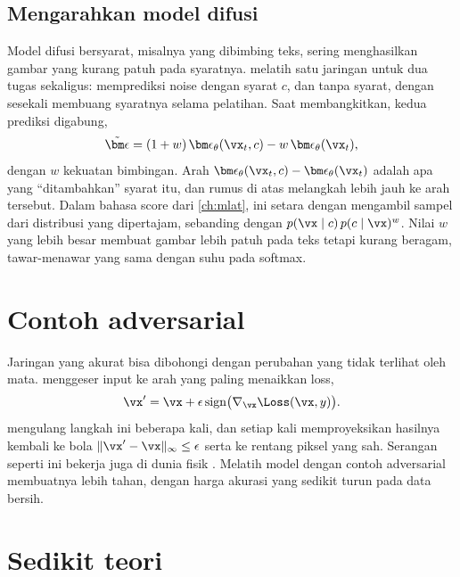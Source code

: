 \subsection{Mengarahkan model difusi}

Model difusi bersyarat, misalnya yang dibimbing teks, sering menghasilkan gambar yang kurang patuh pada syaratnya.
 \citep{ho2022cfg} melatih satu jaringan untuk dua tugas sekaligus: memprediksi noise dengan
syarat $c$, dan tanpa syarat, dengan sesekali membuang syaratnya selama pelatihan. Saat membangkitkan, kedua prediksi
digabung,
\begin{equation}
\tilde{\bm\epsilon}=(1+w)\,\bm\epsilon_\theta(\vx_t,c)-w\,\bm\epsilon_\theta(\vx_t),
\end{equation}
dengan $w$ kekuatan bimbingan. Arah $\bm\epsilon_\theta(\vx_t,c)-\bm\epsilon_\theta(\vx_t)$ adalah apa yang ``ditambahkan''
syarat itu, dan rumus di atas melangkah lebih jauh ke arah tersebut. Dalam bahasa score dari \cref{ch:mlat}, ini setara
dengan mengambil sampel dari distribusi yang dipertajam, sebanding dengan $p(\vx\mid c)\,p(c\mid\vx)^{w}$. Nilai $w$ yang lebih
besar membuat gambar lebih patuh pada teks tetapi kurang beragam, tawar-menawar yang sama dengan suhu pada softmax.

\section{Contoh adversarial}

Jaringan yang akurat bisa dibohongi dengan perubahan yang tidak terlihat oleh mata.
 menggeser input ke arah yang paling menaikkan loss,
\begin{equation}
\vx'=\vx+\epsilon\,\mathrm{sign}\big(\nabla_{\vx}\Loss(\vx,y)\big).
\end{equation}
 mengulang langkah ini beberapa kali, dan setiap kali
memproyeksikan hasilnya kembali ke bola $\|\vx'-\vx\|_\infty\le\epsilon$ serta ke rentang piksel
yang sah. Serangan seperti ini bekerja juga di dunia fisik \citep{eykholt2018}. Melatih model dengan
contoh adversarial membuatnya lebih tahan, dengan harga akurasi yang sedikit turun pada data
bersih.

\section{Sedikit teori}

